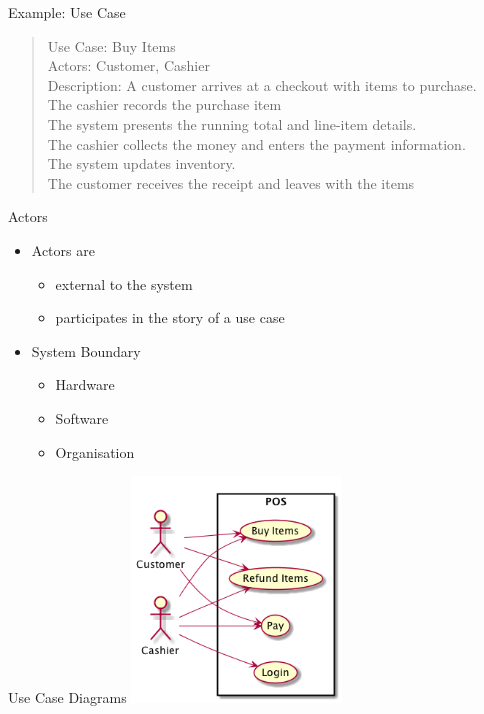 \documentclass[10pt,t,a4paper]{beamer}
\begin{document}
\begin{frame}[label=sec-1-4]{Example: Use Case}
\begin{verse}
Use Case: Buy Items \\
Actors: Customer, Cashier \\
Description: A customer arrives at a checkout with items to purchase. \\
\hspace*{3em}The cashier records the purchase item \\
\hspace*{6em}The system presents the running total and line-item details. \\
\hspace*{3em}The cashier collects the money and enters the payment information. \\
\hspace*{6em}The system updates inventory. \\
\hspace*{3em}The customer receives the receipt and leaves with the items \\
\end{verse}
\end{frame}
\begin{frame}[label=sec-1-5]{Actors}
\begin{itemize}
\item Actors are
\begin{itemize}
\item external to the system
\item participates in the story of a use case
\end{itemize}
\item System Boundary
\begin{itemize}
\item Hardware
\item Software
\item Organisation
\end{itemize}
\end{itemize}
\end{frame}
\begin{frame}[label=sec-1-6]{Use Case Diagrams}
\includegraphics[height=6cm]{FUseCaseDiagram.png}
\end{frame}
\end{document}

